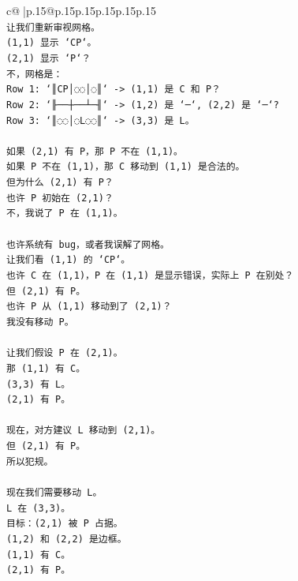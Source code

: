 \documentclass{article}
\begin{document}
{\begin{supertabular}{c@{$\;$}|p{.15\linewidth}@{}p{.15\linewidth}p{.15\linewidth}p{.15\linewidth}p{.15\linewidth}p{.15\linewidth}}
{{{\\ 
\texttt{让我们重新审视网格。} \\
\texttt{(1,1) 显示 `CP`。} \\
\texttt{(2,1) 显示 `P`？} \\
\texttt{不，网格是：} \\
\texttt{Row 1: `║CP│◌◌│◌║` {-}> (1,1) 是 C 和 P？} \\
\texttt{Row 2: `╟──┼──┴─╢` {-}> (1,2) 是 `─`, (2,2) 是 `─`?} \\
\texttt{Row 3: `║◌◌│◌L◌◌║` {-}> (3,3) 是 L。} \\
\\ 
\texttt{如果 (2,1) 有 P，那 P 不在 (1,1)。} \\
\texttt{如果 P 不在 (1,1)，那 C 移动到 (1,1) 是合法的。} \\
\texttt{但为什么 (2,1) 有 P？} \\
\texttt{也许 P 初始在 (2,1)？} \\
\texttt{不，我说了 P 在 (1,1)。} \\
\\ 
\texttt{也许系统有 bug，或者我误解了网格。} \\
\texttt{让我们看 (1,1) 的 `CP`。} \\
\texttt{也许 C 在 (1,1)，P 在 (1,1) 是显示错误，实际上 P 在别处？} \\
\texttt{但 (2,1) 有 P。} \\
\texttt{也许 P 从 (1,1) 移动到了 (2,1)？} \\
\texttt{我没有移动 P。} \\
\\ 
\texttt{让我们假设 P 在 (2,1)。} \\
\texttt{那 (1,1) 有 C。} \\
\texttt{(3,3) 有 L。} \\
\texttt{(2,1) 有 P。} \\
\\ 
\texttt{现在，对方建议 L 移动到 (2,1)。} \\
\texttt{但 (2,1) 有 P。} \\
\texttt{所以犯规。} \\
\\ 
\texttt{现在我们需要移动 L。} \\
\texttt{L 在 (3,3)。} \\
\texttt{目标：(2,1) 被 P 占据。} \\
\texttt{(1,2) 和 (2,2) 是边框。} \\
\texttt{(1,1) 有 C。} \\
\texttt{(2,1) 有 P。} \\
}}}
\end{supertabular}}
\end{document}
